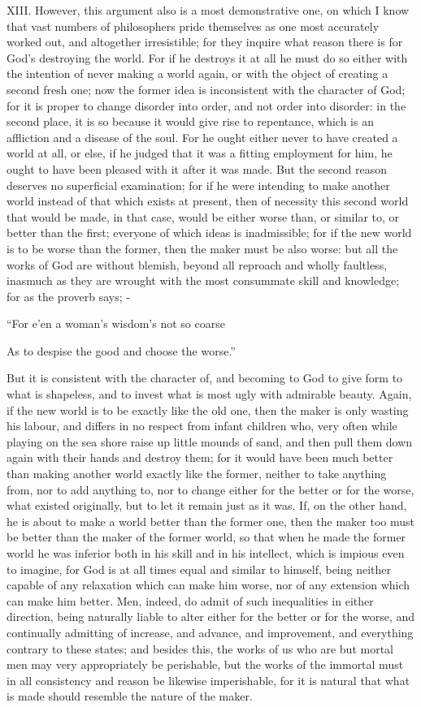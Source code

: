 XIII. However, this argument also is a most demonstrative one, on which I know that vast numbers
of philosophers pride themselves as one most accurately worked out, and altogether irresistible;
for they inquire what reason there is for God's destroying the world. For if he destroys it at all he
must do so either with the intention of never making a world again, or with the object of creating a
second fresh one; now the former idea is inconsistent with the character of God; for it is proper to
change disorder into order, and not order into disorder: in the second place, it is so because it
would give rise to repentance, which is an affliction and a disease of the soul. For he ought either
never to have created a world at all, or else, if he judged that it was a fitting employment for him, he
ought to have been pleased with it after it was made. But the second reason deserves no
superficial examination; for if he were intending to make another world instead of that which exists
at present, then of necessity this second world that would be made, in that case, would be either
worse than, or similar to, or better than the first; everyone of which ideas is inadmissible; for if the
new world is to be worse than the former, then the maker must be also worse: but all the works of
God are without blemish, beyond all reproach and wholly faultless, inasmuch as they are wrought
with the most consummate skill and knowledge; for as the proverb says; -

``For e'en a woman's wisdom's not so coarse

As to despise the good and choose the worse.''

But it is consistent with the character of, and becoming to God to give form to what is shapeless,
and to invest what is most ugly with admirable beauty. Again, if the new world is to be exactly like
the old one, then the maker is only wasting his labour, and differs in no respect from infant children
who, very often while playing on the sea shore raise up little mounds of sand, and then pull them
down again with their hands and destroy them; for it would have been much better than making
another world exactly like the former, neither to take anything from, nor to add anything to, nor to
change either for the better or for the worse, what existed originally, but to let it remain just as it
was. If, on the other hand, he is about to make a world better than the former one, then the maker
too must be better than the maker of the former world, so that when he made the former world he
was inferior both in his skill and in his intellect, which is impious even to imagine, for God is at all
times equal and similar to himself, being neither capable of any relaxation which can make him
worse, nor of any extension which can make him better. Men, indeed, do admit of such inequalities
in either direction, being naturally liable to alter either for the better or for the worse, and continually
admitting of increase, and advance, and improvement, and everything contrary to these states;
and besides this, the works of us who are but mortal men may very appropriately be perishable, but
the works of the immortal must in all consistency and reason be likewise imperishable, for it is
natural that what is made should resemble the nature of the maker.

